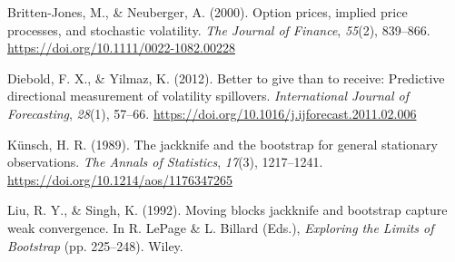 \documentclass[12pt, a4paper]{article}
\theoremstyle{plain}
\theoremstyle{definition}
\begin{document}
Britten-Jones, M., \& Neuberger, A. (2000). Option prices, implied price processes, and stochastic volatility. \textit{The Journal of Finance}, \textit{55}(2), 839--866. \url{https://doi.org/10.1111/0022-1082.00228}

Diebold, F. X., \& Yilmaz, K. (2012). Better to give than to receive: Predictive directional measurement of volatility spillovers. \textit{International Journal of Forecasting}, \textit{28}(1), 57--66. \url{https://doi.org/10.1016/j.ijforecast.2011.02.006}

Künsch, H. R. (1989). The jackknife and the bootstrap for general stationary observations. \textit{The Annals of Statistics}, \textit{17}(3), 1217--1241. \url{https://doi.org/10.1214/aos/1176347265}

Liu, R. Y., \& Singh, K. (1992). Moving blocks jackknife and bootstrap capture weak convergence. In R. LePage \& L. Billard (Eds.), \textit{Exploring the Limits of Bootstrap} (pp. 225--248). Wiley.

\endgroup
\end{document}
